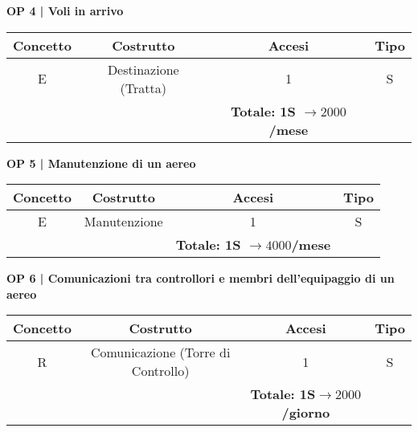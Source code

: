 \textbf{\small OP 4 | Voli in arrivo}\\

\begin{tabular}{ c c c c} %
	\hline
	\textbf{Concetto} & \textbf{Costrutto} & \textbf{Accesi} & \textbf{Tipo}\\
	\hline
	\textsf{\small E} & \textsf{\small Destinazione (Tratta)} & \textsf{\small 1} &  \textsf{\small S}\\
	\hline
	\textsf{\small } & \textsf{\small } & \textbf{Totale: 1S $\rightarrow 2000$/mese } \textsf{\small } & \textsf{\small }\\
	\hline
\end{tabular}

\vspace{.6cm}


\textbf{\small OP 5 | Manutenzione di un aereo}\\

\begin{tabular}{ c c c c} %
	\hline
	\textbf{Concetto} & \textbf{Costrutto} & \textbf{Accesi} & \textbf{Tipo}\\
	\hline
	\textsf{\small E} & \textsf{\small Manutenzione} & \textsf{\small 1} &  \textsf{\small S}\\
	\hline
	\textsf{\small } & \textsf{\small } & \textbf{Totale: 1S $\rightarrow 4000$/mese} \textsf{\small } & \textsf{\small }\\
	\hline
\end{tabular}

\vspace{.6cm}


\textbf{\small OP 6 | Comunicazioni tra controllori e membri dell'equipaggio di un aereo}\\

\begin{tabular}{ c c c c} %
	\hline
	\textbf{Concetto} & \textbf{Costrutto} & \textbf{Accesi} & \textbf{Tipo}\\
	\hline
	\textsf{\small R} & \textsf{\small Comunicazione (Torre di Controllo)} & \textsf{\small 1} &  \textsf{\small S}\\
	\hline
	\textsf{\small } & \textsf{\small } & \textbf{Totale: 1S$\rightarrow 2000$/giorno } \textsf{\small } & \textsf{\small }\\
	\hline
\end{tabular}

